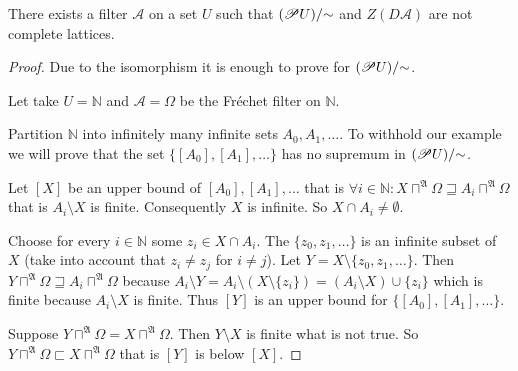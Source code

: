 \begin{example}
There exists a filter $\mathcal{A}$ on a set $U$ such that $(\mathscr{P} U)/\mathord\sim$
and $Z(D\mathcal{A})$ are not complete lattices.\end{example}
\begin{proof}
Due to the isomorphism it is enough to prove for $(\mathscr{P} U)/\mathord\sim$.

Let take $U=\mathbb{N}$ and $\mathcal{A}=\Omega$ be the Fr\'echet
filter on $\mathbb{N}$.

Partition $\mathbb{N}$ into infinitely many infinite sets $A_{0},A_{1},\ldots$.
To withhold our example we will prove that the set $\{[A_{0}],[A_{1}],\dots\}$
has no supremum in $(\mathscr{P} U)/\mathord\sim$.

Let $[X]$ be an upper bound of $[A_{0}],[A_{1}],\ldots$ that is
$\forall i\in\mathbb{N}:X\sqcap^{\mathfrak{A}}\Omega\sqsupseteq A_{i}\sqcap^{\mathfrak{A}}\Omega$
that is $A_{i}\setminus X$ is finite. Consequently $X$ is infinite.
So $X\cap A_{i}\ne\emptyset$.

Choose for every $i\in\mathbb{N}$ some $z_{i}\in X\cap A_{i}$. The
$\{z_{0},z_{1},\dots\}$ is an infinite subset of $X$ (take into
account that $z_{i}\ne z_{j}$ for $i\ne j$). Let $Y=X\setminus\{z_{0},z_{1},\dots\}$.
Then $Y\sqcap^{\mathfrak{A}}\Omega\sqsupseteq A_{i}\sqcap^{\mathfrak{A}}\Omega$
because $A_{i}\setminus Y=A_{i}\setminus(X\setminus\{z_{i}\})=(A_{i}\setminus X)\cup\{z_{i}\}$
which is finite because $A_{i}\setminus X$ is finite. Thus $[Y]$
is an upper bound for $\{[A_{0}],[A_{1}],\dots\}$.

Suppose $Y\sqcap^{\mathfrak{A}}\Omega=X\sqcap^{\mathfrak{A}}\Omega$.
Then $Y\setminus X$ is finite what is not true. So $Y\sqcap^{\mathfrak{A}}\Omega\sqsubset X\sqcap^{\mathfrak{A}}\Omega$
that is $[Y]$ is below $[X]$.
\end{proof}

